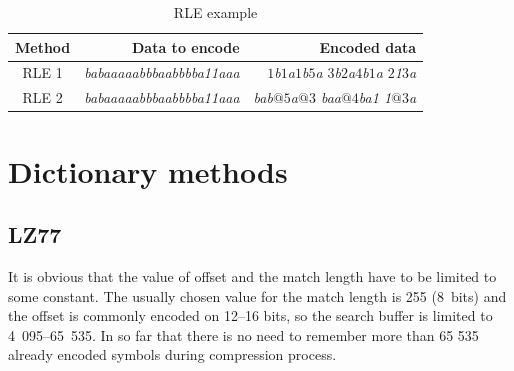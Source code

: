 \documentclass[thesis=M,english]{FITthesis}[2019/12/23]
\begin{document}
\begin{table}\centering
	\caption{RLE example}\label{tab:RLE-example}
	\begin{tabular}{|c|r|r|}
	\hline \textbf{Method} & \textbf{Data to encode} & \textbf{Encoded data} \\\hline
	RLE 1 & \textit{babaaaaabbbaabbbba11aaa} & \textit{$1$b$1$a$1$b$5$a $3$b$2$a$4$b$1$a $2$1$3$a} \\\hline
	RLE 2 & \textit{babaaaaabbbaabbbba11aaa} & \textit{bab$@5$a$@3$ baa$@4$ba1 1$@3$a} \\\hline
	\end{tabular}
\end{table}




\section{Dictionary methods}

	\subsection{LZ77}
It is obvious that the value of offset and the match length have to be limited to some constant. The usually chosen value for the match length is 255 (8~bits) and the offset is commonly encoded on 12--16 bits, so the search buffer is limited to 4~095--65~535. In so far that there is no need to remember more than 65 535 already encoded symbols during compression process.
\end{document}
